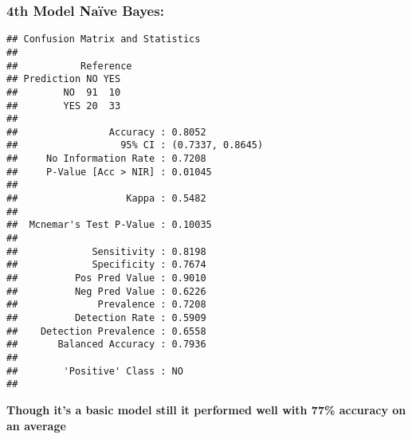 \documentclass[
]{article}
\newenvironment{Shaded}{\begin{snugshade}}{\end{snugshade}}
\newcommand{\AttributeTok}[1]{\textcolor[rgb]{0.13,0.29,0.53}{#1}}
\newcommand{\FunctionTok}[1]{\textcolor[rgb]{0.13,0.29,0.53}{\textbf{#1}}}
\newcommand{\NormalTok}[1]{#1}
\newcommand{\OtherTok}[1]{\textcolor[rgb]{0.56,0.35,0.01}{#1}}
\newcommand{\SpecialCharTok}[1]{\textcolor[rgb]{0.81,0.36,0.00}{\textbf{#1}}}
\begin{document}
\hypertarget{th-model-nauxefve-bayes}{%
\subsubsection{4th Model Naïve Bayes:}\label{th-model-nauxefve-bayes}}

\begin{Shaded}
\end{Shaded}

\begin{verbatim}
## Confusion Matrix and Statistics
## 
##           Reference
## Prediction NO YES
##        NO  91  10
##        YES 20  33
##                                           
##                Accuracy : 0.8052          
##                  95% CI : (0.7337, 0.8645)
##     No Information Rate : 0.7208          
##     P-Value [Acc > NIR] : 0.01045         
##                                           
##                   Kappa : 0.5482          
##                                           
##  Mcnemar's Test P-Value : 0.10035         
##                                           
##             Sensitivity : 0.8198          
##             Specificity : 0.7674          
##          Pos Pred Value : 0.9010          
##          Neg Pred Value : 0.6226          
##              Prevalence : 0.7208          
##          Detection Rate : 0.5909          
##    Detection Prevalence : 0.6558          
##       Balanced Accuracy : 0.7936          
##                                           
##        'Positive' Class : NO              
## 
\end{verbatim}

\textbf{Though it's a basic model still it performed well with 77\%
accuracy on an average}
\end{document}
